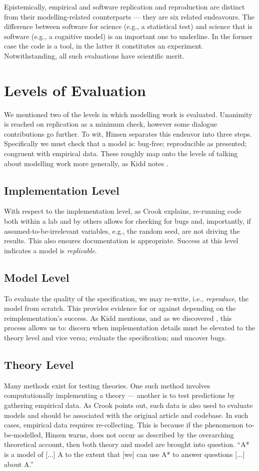 \documentclass[jou]{apa6}
\begin{document}
Epistemically, empirical and software replication and reproduction are distinct from their modelling-related counterparts --- they are six related endeavours.
The difference between software for science (e.g., a statistical test) and science that is software (e.g., a cognitive model) is an important one to underline. 
In the former case the code is a tool, in the latter it constitutes an experiment.
Notwithstanding, all such evaluations have scientific merit.

\section{Levels of Evaluation}
We mentioned two of the levels in which modelling work is evaluated.
Unanimity is reached on replication as a minimum check, however some dialogue contributions go further.
To wit, Hinsen separates this endeavor into three steps.
Specifically we must check that a model is: bug-free; reproducible as presented; congruent with empirical data.
These roughly map onto the levels of talking about modelling work more generally, as Kidd notes \cite{marr82}.

\subsection{Implementation Level}
With respect to the implementation level, as Crook explains, re-running code both within a lab and by others allows for checking for bugs and, importantly, if assumed-to-be-irrelevant variables, e.g., the random seed, are not driving the results.
This also ensures documentation is appropriate. 
Success at this level indicates a model is \textit{replicable}.

\subsection{Model Level}
To evaluate the quality of the specification, we may re-write, i.e., \textit{reproduce}, the model from scratch.
This provides evidence for or against depending on the reimplementation's success.
As Kidd mentions, and as we discovered \cite{cooper14}, this process allows us to: discern when implementation details must be elevated to the theory level and vice versa; evaluate the specification; and uncover bugs.

\subsection{Theory Level}
Many methods exist for testing theories.
One such method involves computationally implementing a theory --- another is to test predictions by gathering empirical data.
As Crook points out, such data is also used to evaluate models and should be associated with the original article and codebase. 
In such cases, empirical data requires re-collecting.
This is because if the phenomenon to-be-modelled, Hinsen warns, does not occur as described by the overarching theoretical account, then both theory and model are brought into question.
``A* is a model of [...] A to the extent that [we] can use A* to answer questions [...] about A.'' \cite[p.~426]{Minsky:1965}
\end{document}
